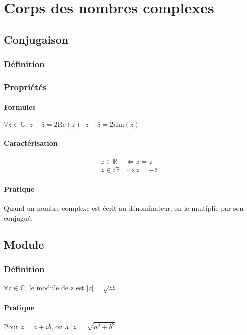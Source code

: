 \documentclass[12pt,a4paper,french]{book}
\begin{document}
			
\chapter{Corps des nombres complexes}
	\section{Conjugaison}
		\subsection{Définition}
		\subsection{Propriétés}
			\subsubsection{Formules}
			$\forall z \in \mathbb{C}, \ z+ \bar{z} = 2\mbox{Re}(z), \ z - \bar{z} = 2i\mbox{Im}(z)$
		
			\subsubsection{Caractérisation}
				\begin{equation} \begin{split}
						z \in \mathbb{R} &\Leftrightarrow z = \bar{z} \\
						z \in i\mathbb{R} &\Leftrightarrow z = -\bar{z}
					\end{split}
				\end{equation} 
			\subsubsection{Pratique}
				Quand un nombre complexe est écrit au dénominateur, on le multiplie par son conjugué.
	\section{Module}
		\subsection{Définition}
			$\forall z \in \mathbb{C}$, le module de z est $\left| z\right| = \sqrt{z \bar{z}}$
			\subsubsection{Pratique}
			Pour $z=a+ib$, on a $\left| z\right| = \sqrt{a^2 + b^2}$
\end{document}
